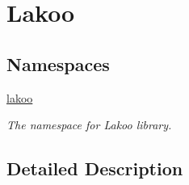 \hypertarget{group__lakoo}{}\section{Lakoo}
\label{group__lakoo}
\subsection*{Namespaces}
\begin{DoxyCompactItemize}
\item 
 \hyperlink{namespacelakoo}{lakoo}
\begin{DoxyCompactList}\small\item\em The namespace for Lakoo library. \end{DoxyCompactList}\end{DoxyCompactItemize}


\subsection{Detailed Description}
